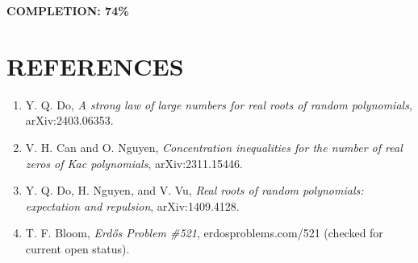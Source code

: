 \noindent\textbf{COMPLETION: 74\%}

\section{REFERENCES}

\begin{enumerate}
\item Y. Q. Do, \emph{A strong law of large numbers for real roots of random polynomials}, arXiv:2403.06353.
\item V. H. Can and O. Nguyen, \emph{Concentration inequalities for the number of real zeros of Kac polynomials}, arXiv:2311.15446.
\item Y. Q. Do, H. Nguyen, and V. Vu, \emph{Real roots of random polynomials: expectation and repulsion}, arXiv:1409.4128.
\item T. F. Bloom, \emph{Erd\H{o}s Problem \#521}, erdosproblems.com/521 (checked for current open status).
\end{enumerate}
